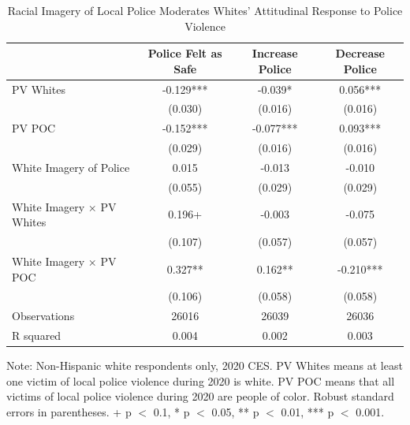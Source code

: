 \documentclass[
  12pt,
]{article}
\begin{document}
\hypertarget{tbl-racial.component}{}
\begin{table}
\caption{\label{tbl-racial.component}Racial Imagery of Local Police Moderates Whites' Attitudinal Response to
Police Violence }\tabularnewline

\centering
\begin{threeparttable}
\begin{tabular}[t]{lccc}
\toprule
  & Police Felt as Safe & Increase Police & Decrease Police\\
\midrule
PV Whites & -0.129*** & -0.039* & 0.056***\\
 & (0.030) & (0.016) & (0.016)\\
PV POC & -0.152*** & -0.077*** & 0.093***\\
 & (0.029) & (0.016) & (0.016)\\
White Imagery of Police & 0.015 & -0.013 & -0.010\\
 & (0.055) & (0.029) & (0.029)\\
White Imagery × PV Whites & 0.196+ & -0.003 & -0.075\\
 & (0.107) & (0.057) & (0.057)\\
White Imagery × PV POC & 0.327** & 0.162** & -0.210***\\
 & (0.106) & (0.058) & (0.058)\\
\midrule
Observations & 26016 & 26039 & 26036\\
R squared & 0.004 & 0.002 & 0.003\\
\bottomrule
\end{tabular}
\begin{tablenotes}
\item Note: Non-Hispanic white respondents only, 2020 CES. PV Whites means at least one victim of local police violence during 2020 is white. PV POC means that all victims of local police violence during 2020 are people of color. Robust standard errors in parentheses. + p $<$ 0.1, * p $<$ 0.05, ** p $<$ 0.01, *** p $<$ 0.001.
\end{tablenotes}
\end{threeparttable}
\end{table}
\end{document}
